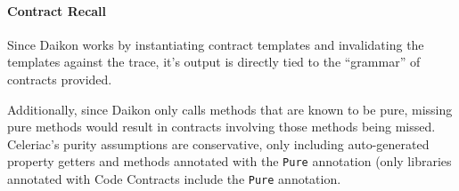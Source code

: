 \paragraph{Contract Recall}

Since Daikon works by instantiating contract templates and
invalidating the templates against the trace, it's output is directly
tied to the ``grammar'' of contracts provided.

Additionally, since Daikon only calls methods that are known to be
pure, missing pure methods would result in contracts involving those
methods being missed. Celeriac's purity assumptions are conservative,
only including auto-generated property getters and methods annotated
with the \verb|Pure| annotation (only libraries annotated with Code
Contracts include the \verb|Pure| annotation.
